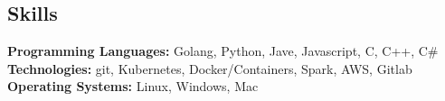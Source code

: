 \documentclass[margin,line]{resume}
\begin{document}
\begin{resume}

\filbreak
\section{\mysidestyle Skills}
\textbf{Programming Languages:} Golang, Python, Jave, Javascript, C, C++, C\#\\
\textbf{Technologies:}  git, Kubernetes, Docker/Containers, Spark, AWS, Gitlab\\
\textbf{Operating Systems:} Linux, Windows, Mac





\end{resume}
\end{document}
